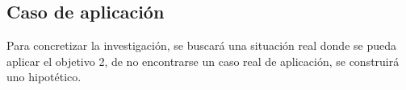 \subsection{Caso de aplicación}
Para concretizar la investigación, se buscará una situación real donde se pueda aplicar el objetivo 2, 
de no encontrarse un caso real de aplicación, se construirá uno hipotético.

